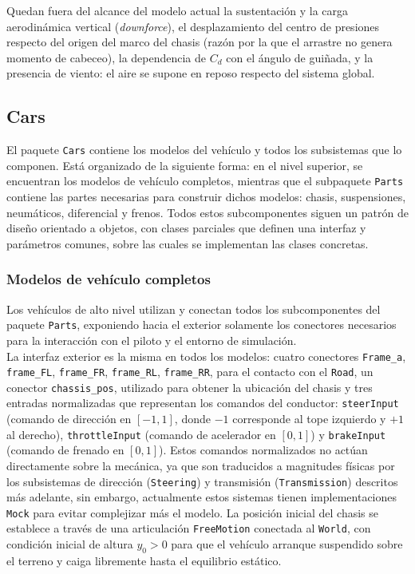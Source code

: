 Quedan fuera del alcance del modelo actual la sustentación y la carga aerodinámica vertical (\textit{downforce}), el desplazamiento del centro de presiones respecto del origen del marco del chasis (razón por la que el arrastre no genera momento de cabeceo), la dependencia de $C_d$ con el ángulo de guiñada, y la presencia de viento: el aire se supone en reposo respecto del sistema global.\\

\subsection{Cars}

El paquete \verb|Cars| contiene los modelos del vehículo y todos los subsistemas que lo componen. Está organizado de la siguiente forma: en el nivel superior, se encuentran los modelos de vehículo completos, mientras que el subpaquete \verb|Parts| contiene las partes necesarias para construir dichos modelos: chasis, suspensiones, neumáticos, diferencial y frenos. Todos estos subcomponentes siguen un patrón de diseño orientado a objetos, con clases parciales que definen una interfaz y parámetros comunes, sobre las cuales se implementan las clases concretas.\\

\subsubsection*{Modelos de vehículo completos}

Los vehículos de alto nivel utilizan y conectan todos los subcomponentes del paquete \verb|Parts|, exponiendo hacia el exterior solamente los conectores necesarios para la interacción con el piloto y el entorno de simulación.\\

La interfaz exterior es la misma en todos los modelos: cuatro conectores  \verb|Frame_a|, \verb|frame_FL|, \verb|frame_FR|, \verb|frame_RL|, \verb|frame_RR|, para el contacto con el \verb|Road|, un conector \verb|chassis_pos|, utilizado para obtener la ubicación del chasis y tres entradas normalizadas que representan los comandos del conductor: \verb|steerInput| (comando de dirección en $[-1, 1]$, donde $-1$ corresponde al tope izquierdo y $+1$ al derecho), \verb|throttleInput| (comando de acelerador en $[0, 1]$) y \verb|brakeInput| (comando de frenado en $[0, 1]$). Estos comandos normalizados no actúan directamente sobre la mecánica, ya que son traducidos a magnitudes físicas por los subsistemas de dirección (\verb|Steering|) y transmisión (\verb|Transmission|) descritos más adelante, sin embargo, actualmente estos sistemas tienen implementaciones \verb|Mock| para evitar complejizar más el modelo. La posición inicial del chasis se establece a través de una articulación \verb|FreeMotion| conectada al \verb|World|, con condición inicial de altura $y_0 > 0$ para que el vehículo arranque suspendido sobre el terreno y caiga libremente hasta el equilibrio estático.\\


